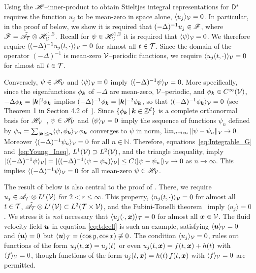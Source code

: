 \documentclass[amsa]{ipart}
\begin{document}
Using the $\mathscr{H}$--inner-product to obtain Stieltjes integral
representations for $\mathsf{D}^*$ requires the function $u_j$ to be
mean-zero in space alone, $\langle u_j\rangle_{\mathcal{V}}=0$. In particular, in the
proof of  below, we show it is required that
$(-\Delta)^{-1}u_j\in\mathscr{F}$, where
$\mathscr{F}=\tilde{\mathscr{A}}_{\mathcal{T}}\otimes\mathscr{H}^{1,2}_{\mathcal{V}}$. Recall for
$\psi\in\mathscr{H}^{1,2}_{\mathcal{V}}$ it is required that $\langle\psi\rangle_{\mathcal{V}}=0$. We 
therefore require $\langle(-\Delta)^{-1}u_j(t,\cdot)\rangle_{\mathcal{V}}=0$ for almost all
$t\in\mathcal{T}$. Since the domain of the operator $(-\Delta)^{-1}$ is mean-zero
$\mathcal{V}$--periodic functions, we require $\langle u_j(t,\cdot)\rangle_{\mathcal{V}}=0$ for almost
all  $t\in\mathcal{T}$.



Conversely, $\psi\in\mathscr{H}_{\mathcal{V}}$ and $\langle\psi\rangle_{\mathcal{V}}=0$ imply
$\langle(-\Delta)^{-1}\psi\rangle_{\mathcal{V}}=0$. More specifically, since the eigenfunctions  
$\phi_{\boldsymbol{k}}$ of $-\Delta$ are mean-zero, $\mathcal{V}$--periodic, and $\phi_{\boldsymbol{k}}\in
C^\infty(\mathcal{V})$, $-\Delta\phi_{\boldsymbol{k}}=|\boldsymbol{k}|^2\phi_{\boldsymbol{k}}$ implies
$(-\Delta)^{-1}\phi_{\boldsymbol{k}}=|\boldsymbol{k}|^{-2}\phi_{\boldsymbol{k}}$, so that
$\langle(-\Delta)^{-1}\phi_{\boldsymbol{k}}\rangle_{\mathcal{V}}=0$ (see Theorem 1 in Section 4.2
of~\cite{McOwen:2003:PDE}). Since $\{\phi_{\boldsymbol{k}}\,|\,\boldsymbol{k}\in\mathbb{Z}^d\}$
is a complete orthonormal basis for
$\mathscr{H}_{\mathcal{V}}$~\cite{Folland:99:RealAnalysis}, $\psi\in\mathscr{H}_{\mathcal{V}}$ and
$\langle\psi\rangle_{\mathcal{V}}=0$ imply the sequence of functions $\psi_n$ defined by 
$\psi_n=\sum_{|\boldsymbol{k}|\leq   n}\langle\psi,\phi_{\boldsymbol{k}}\rangle_{\mathcal{V}}\,\phi_{\boldsymbol{k}}$ converges to
$\psi$ in norm, $\lim_{n\to\infty}\|\psi-\psi_n\|_{\mathcal{V}}\to0$. Moreover
$\langle(-\Delta)^{-1}\psi_n\rangle_{\mathcal{V}}=0$ for all
$n\in\mathbb{N}$. Therefore, equations~\eqref{eq:Integrable_G}
and~\eqref{eq:Young_Ineq}, $L^1(\mathcal{V})\supset L^2(\mathcal{V})$, and the triangle
inequality, imply 
$|\langle(-\Delta)^{-1}\psi\rangle_{\mathcal{V}}|=|\langle(-\Delta)^{-1}(\psi-\psi_n)\rangle_{\mathcal{V}}|\leq C\langle|\psi-\psi_n|\rangle_{\mathcal{V}}\to0$
as $n\to\infty$. This implies $\langle(-\Delta)^{-1}\psi\rangle_{\mathcal{V}}=0$ for all mean-zero
$\psi\in\mathscr{H}_{\mathcal{V}}$.    






The result of  below is also central to the
proof of . There, we require
$u_j\in\tilde{\mathscr{A}}_{\mathcal{T}}\otimes L^r(\mathcal{V})$ for $2<r\leq\infty$. This property,
$\langle u_j(t,\cdot)\rangle_{\mathcal{V}}=0$ for almost all $t\in\mathcal{T}$, 
$\tilde{\mathscr{A}}_{\mathcal{T}}\otimes L^r(\mathcal{V})\subset L^2(\mathcal{T}\times\mathcal{V})$, and the
Fubini-Tonelli theorem~\cite{Folland:99:RealAnalysis}  imply $\langle
u_j\rangle=0$. We stress it is  
\emph{not} necessary that $\langle u_j(\cdot,\boldsymbol{x})\rangle_{\mathcal{T}}=0$ for almost all
$\boldsymbol{x}\in\mathcal{V}$. The fluid velocity
field $\boldsymbol{u}$ in equation \eqref{eq:tdcell} is such an example,
satisfying $\langle\boldsymbol{u}\rangle_{\mathcal{V}}=0$ and $\langle\boldsymbol{u}\rangle=0$ but
$\langle\boldsymbol{u}\rangle_{\mathcal{T}}=(\cos{y},\cos{x})\not\equiv0$. The condition $\langle
u_j\rangle_{\mathcal{V}}=0$, rules out functions of the form $u_j(t,\boldsymbol{x})=u_j(t)$
or even $u_j(t,\boldsymbol{x})=f(t,\boldsymbol{x})+h(t)$ with $\langle f\rangle_{\mathcal{V}}=0$, though
functions of the form $u_j(t,\boldsymbol{x})=h(t)\,f(t,\boldsymbol{x})$ with $\langle
f\rangle_{\mathcal{V}}=0$ are permitted.  
\end{document}
